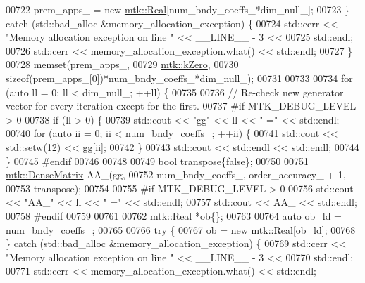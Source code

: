 \begin{DoxyCode}
{{00722     prem\_apps\_ = \textcolor{keyword}{new} \hyperlink{group__c01-roots_gac080bbbf5cbb5502c9f00405f894857d}{mtk::Real}[num\_bndy\_coeffs\_*dim\_null\_];
00723   \} \textcolor{keywordflow}{catch} (std::bad\_alloc &memory\_allocation\_exception) \{
00724     std::cerr << \textcolor{stringliteral}{"Memory allocation exception on line "} << \_\_LINE\_\_ - 3 <<
00725 std::endl;
00726     std::cerr << memory\_allocation\_exception.what() << std::endl;
00727   \}
00728   memset(prem\_apps\_,
00729          \hyperlink{group__c01-roots_ga59a451a5fae30d59649bcda274fea271}{mtk::kZero},
00730          \textcolor{keyword}{sizeof}(prem\_apps\_[0])*num\_bndy\_coeffs\_*dim\_null\_);
00731 
00733 
00734   \textcolor{keywordflow}{for} (\textcolor{keyword}{auto} ll = 0; ll < dim\_null\_; ++ll) \{
00735 
00736     \textcolor{comment}{// Re-check new generator vector for every iteration except for the first.}
00737 \textcolor{preprocessor}{    #if MTK\_DEBUG\_LEVEL > 0}
00738     \textcolor{keywordflow}{if} (ll > 0) \{
00739       std::cout << \textcolor{stringliteral}{"gg"} << ll << \textcolor{stringliteral}{" ="} << std::endl;
00740       \textcolor{keywordflow}{for} (\textcolor{keyword}{auto} ii = 0; ii < num\_bndy\_coeffs\_; ++ii) \{
00741         std::cout << std::setw(12) << gg[ii];
00742       \}
00743       std::cout << std::endl << std::endl;
00744     \}
00745 \textcolor{preprocessor}{    #endif}
00746 
00748 
00749     \textcolor{keywordtype}{bool} transpose\{\textcolor{keyword}{false}\};
00750 
00751     \hyperlink{classmtk_1_1DenseMatrix}{mtk::DenseMatrix} AA\_(gg,
00752                          num\_bndy\_coeffs\_, order\_accuracy\_ + 1,
00753                          transpose);
00754 
00755 \textcolor{preprocessor}{    #if MTK\_DEBUG\_LEVEL > 0}
00756     std::cout << \textcolor{stringliteral}{"AA\_"} << ll << \textcolor{stringliteral}{" ="} << std::endl;
00757     std::cout << AA\_ << std::endl;
00758 \textcolor{preprocessor}{    #endif}
00759 
00761 
00762     \hyperlink{group__c01-roots_gac080bbbf5cbb5502c9f00405f894857d}{mtk::Real} *ob\{\};
00763 
00764     \textcolor{keyword}{auto} ob\_ld = num\_bndy\_coeffs\_;
00765 
00766     \textcolor{keywordflow}{try} \{
00767       ob = \textcolor{keyword}{new} \hyperlink{group__c01-roots_gac080bbbf5cbb5502c9f00405f894857d}{mtk::Real}[ob\_ld];
00768     \} \textcolor{keywordflow}{catch} (std::bad\_alloc &memory\_allocation\_exception) \{
00769       std::cerr << \textcolor{stringliteral}{"Memory allocation exception on line "} << \_\_LINE\_\_ - 3 <<
00770         std::endl;
00771       std::cerr << memory\_allocation\_exception.what() << std::endl;
}}
\end{DoxyCode}
